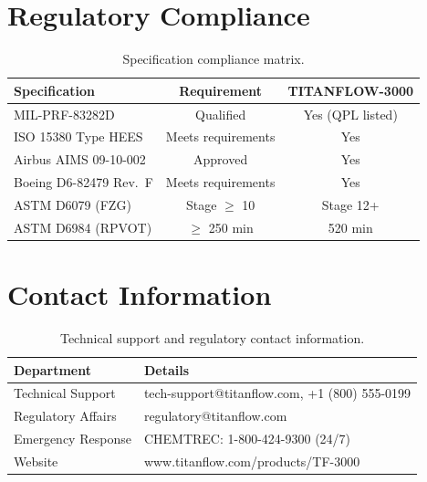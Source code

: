 \documentclass[
    language=english,
    doctype=data-sheet,
    institution=none,
]{../../omnilatex}
\begin{document}
\section{Regulatory Compliance}
\label{sec:regulatory}

\begin{table}[htbp]
    \centering
    \caption{Specification compliance matrix.}
    \label{tab:compliance}
    \begin{tabular}{@{}lcc@{}}
        \toprule
        Specification & Requirement & TITANFLOW-3000 \\
        \midrule
        MIL-PRF-83282D & Qualified & Yes (QPL listed) \\
        ISO 15380 Type HEES & Meets requirements & Yes \\
        Airbus AIMS 09-10-002 & Approved & Yes \\
        Boeing D6-82479 Rev.\ F & Meets requirements & Yes \\
        ASTM D6079 (FZG) & Stage $\geq$ 10 & Stage 12+ \\
        ASTM D6984 (RPVOT) & $\geq$ 250 min & 520 min \\
        \bottomrule
    \end{tabular}
\end{table}

\section{Contact Information}
\label{sec:contact}

\begin{table}[htbp]
    \centering
    \caption{Technical support and regulatory contact information.}
    \label{tab:contact}
    \begin{tabular}{@{}p{4cm}p{10cm}@{}}
        \toprule
        Department & Details \\
        \midrule
        Technical Support & tech-support@titanflow.com, +1 (800) 555-0199 \\
        Regulatory Affairs & regulatory@titanflow.com \\
        Emergency Response & CHEMTREC: 1-800-424-9300 (24/7) \\
        Website & www.titanflow.com/products/TF-3000 \\
        \bottomrule
    \end{tabular}
\end{table}
\end{document}
